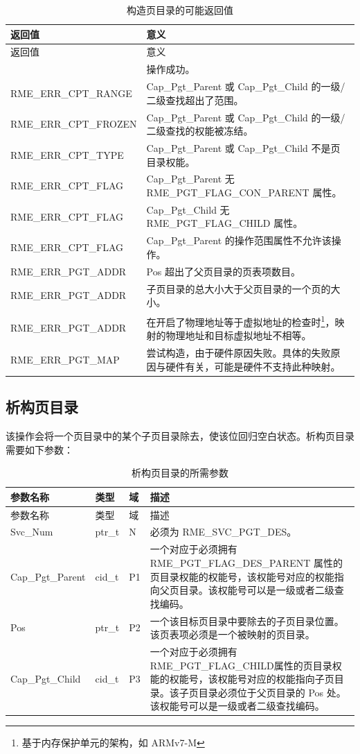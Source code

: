 \begin{xltabular}{\textwidth}{@{}>{\hsize\raggedright\arraybackslash}X>{\hsize\raggedright\arraybackslash}X@{}}
\caption{构造页目录的可能返回值}\label{tab:3-19-construct-page-directory-return-values}\\
\toprule
返回值 & 意义\tabularnewline
\endfirsthead
\toprule
返回值 & 意义\tabularnewline
\midrule
\endhead
\bottomrule
{} & 操作成功。\tabularnewline
    RME\_ERR\_CPT\_RANGE & Cap\_Pgt\_Parent 或 Cap\_Pgt\_Child 的一级/二级查找超出了范围。\tabularnewline
    RME\_ERR\_CPT\_FROZEN & Cap\_Pgt\_Parent 或 Cap\_Pgt\_Child 的一级/二级查找的权能被冻结。\tabularnewline
    RME\_ERR\_CPT\_TYPE & Cap\_Pgt\_Parent 或 Cap\_Pgt\_Child 不是页目录权能。\tabularnewline
    RME\_ERR\_CPT\_FLAG & Cap\_Pgt\_Parent 无 RME\_PGT\_FLAG\_CON\_PARENT 属性。\tabularnewline
    RME\_ERR\_CPT\_FLAG & Cap\_Pgt\_Child 无 RME\_PGT\_FLAG\_CHILD 属性。\tabularnewline
    RME\_ERR\_CPT\_FLAG & Cap\_Pgt\_Parent 的操作范围属性不允许该操作。\tabularnewline
    RME\_ERR\_PGT\_ADDR & Pos 超出了父页目录的页表项数目。\tabularnewline
    RME\_ERR\_PGT\_ADDR & 子页目录的总大小大于父页目录的一个页的大小。\tabularnewline
    RME\_ERR\_PGT\_ADDR & 在开启了物理地址等于虚拟地址的检查时\footnote{基于内存保护单元的架构，如 ARMv7-M}，映射的物理地址和目标虚拟地址不相等。\tabularnewline
    RME\_ERR\_PGT\_MAP & 尝试构造，由于硬件原因失败。具体的失败原因与硬件有关，可能是硬件不支持此种映射。\tabularnewline
\end{xltabular}

\subsection{析构页目录}\label{subsec:3-destruct-page-directory}

该操作会将一个页目录中的某个子页目录除去，使该位回归空白状态。析构页目录需要如下参数：

\begin{xltabular}{\textwidth}{@{}>{\hsize\raggedright\arraybackslash}X>{\hsize\raggedright\arraybackslash}X>{\hsize\raggedright\arraybackslash}X>{\hsize\raggedright\arraybackslash}X@{}}
\caption{析构页目录的所需参数}\label{tab:3-20-destruct-page-directory-parameters}\\
\toprule
参数名称 & 类型 & 域 & 描述\tabularnewline
\endfirsthead
\toprule
参数名称 & 类型 & 域 & 描述\tabularnewline
\midrule
\endhead
\bottomrule
\endlastfoot
Svc\_Num & ptr\_t & N & 必须为 RME\_SVC\_PGT\_DES。\tabularnewline
Cap\_Pgt\_Parent & cid\_t & P1 &
一个对应于必须拥有 RME\_PGT\_FLAG\_DES\_PARENT 属性的页目录权能的权能号，该权能号对应的权能指向父页目录。该权能号可以是一级或者二级查找编码。\tabularnewline
Pos & ptr\_t & P2 &
一个该目标页目录中要除去的子页目录位置。该页表项必须是一个被映射的页目录。\tabularnewline
Cap\_Pgt\_Child & cid\_t & P3 &
一个对应于必须拥有RME\_PGT\_FLAG\_CHILD属性的页目录权能的权能号，该权能号对应的权能指向子页目录。该子页目录必须位于父页目录的 Pos 处。该权能号可以是一级或者二级查找编码。\tabularnewline
\end{xltabular}

